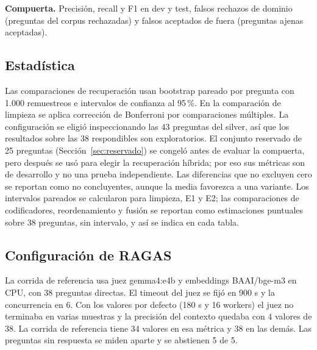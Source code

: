 \textbf{Compuerta.} Precisi\'on, recall y F1 en dev y test, falsos rechazos de dominio (preguntas del corpus rechazadas) y falsos aceptados de fuera (preguntas ajenas aceptadas).

\subsection{Estad\'istica}

Las comparaciones de recuperaci\'on usan bootstrap pareado por pregunta con 1.000 remuestreos e intervalos de confianza al 95\,\%. En la comparaci\'on de limpieza se aplica correcci\'on de Bonferroni por comparaciones m\'ultiples. La configuraci\'on se eligi\'o inspeccionando las 43 preguntas del silver, as\'i que los resultados sobre las 38 respondibles son exploratorios. El conjunto reservado de 25 preguntas (Secci\'on~\ref{sec:reservado}) se congel\'o antes de evaluar la compuerta, pero despu\'es se us\'o para elegir la recuperaci\'on h\'ibrida; por eso sus m\'etricas son de desarrollo y no una prueba independiente. Las diferencias que no excluyen cero se reportan como no concluyentes, aunque la media favorezca a una variante. Los intervalos pareados se calcularon para limpieza, E1 y E2; las comparaciones de codificadores, reordenamiento y fusi\'on se reportan como estimaciones puntuales sobre 38 preguntas, sin intervalo, y as\'i se indica en cada tabla.

\subsection{Configuraci\'on de RAGAS}

La corrida de referencia usa juez gemma4:e4b y embeddings BAAI/bge-m3 en CPU, con 38 preguntas directas. El timeout del juez se fij\'o en 900 s y la concurrencia en 6. Con los valores por defecto (180 s y 16 workers) el juez no terminaba en varias muestras y la precisi\'on del contexto quedaba con 4 valores de 38. La corrida de referencia tiene 34 valores en esa m\'etrica y 38 en las dem\'as. Las preguntas sin respuesta se miden aparte y se abstienen 5 de 5.
